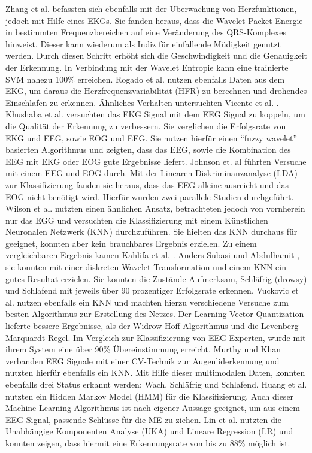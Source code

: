 {Zhang et al. \cite{zhang_6513058} befassten sich ebenfalls mit der Überwachung von Herzfunktionen, jedoch mit Hilfe eines EKGs. Sie fanden heraus, dass die Wavelet Packet Energie in bestimmten Frequenzbereichen auf eine Veränderung des QRS-Komplexes hinweist. Dieser kann wiederum als Indiz für einfallende Müdigkeit genutzt werden. Durch diesen Schritt erhöht sich  die Geschwindigkeit und die Genauigkeit der Erkennung. In Verbindung mit der Wavelet Entropie kann eine trainierte SVM nahezu 100\% erreichen. Rogado et al. \cite{Rogado_4913155} nutzen ebenfalls Daten aus dem EKG, um daraus die Herzfrequenzvariabilität (HFR) zu berechnen und drohendes Einschlafen zu erkennen. Ähnliches Verhalten untersuchten Vicente et al. \cite{Vicente_6164509}. \\

Khushaba et al. \cite{Khushaba_5580017} versuchten das EKG Signal mit dem EEG Signal zu koppeln, um die Qualität der Erkennung zu verbessern. Sie verglichen die Erfolgsrate von EKG und EEG, sowie EOG und EEG. Sie nutzen hierfür einen "`fuzzy wavelet"' basierten Algorithmus und zeigten, dass das EEG, sowie die Kombination des EEG mit EKG oder EOG gute Ergebnisse liefert. Johnson et. al \cite{Johnson11} führten Versuche mit einem EEG und EOG durch. Mit der Linearen Diskriminanzanalyse (LDA) zur Klassifizierung fanden sie heraus, dass das EEG alleine ausreicht und das EOG nicht benötigt wird. Hierfür wurden zwei parallele Studien durchgeführt. Wilson et al. \cite{wilson_890161} nutzten einen ähnlichen Ansatz, betrachteten jedoch von vornherein nur das EGG und versuchten die Klassifizierung mit einem Künstlichen Neuronalen Netzwerk (KNN) durchzuführen. Sie hielten das KNN durchaus für geeignet, konnten aber kein brauchbares Ergebnis erzielen. Zu einem vergleichbaren Ergebnis kamen Kahlifa et al. \cite{khalifa_893852}. Anders Subasi und Abdulhamit \cite{Subasi:2005:ARA:1707423.1707550}, sie konnten mit einer diskreten Wavelet-Transformation und einem KNN ein gutes Resultat erzielen. Sie konnten die Zustände Aufmerksam, Schläfrig (drowsy) und Schlafend mit jeweils über 90 prozentiger Erfolgsrate erkennen. Vuckovic et al. \cite{Vuckovic2002349} nutzen ebenfalls ein KNN und machten hierzu verschiedene Versuche zum besten Algorithmus zur Erstellung des Netzes. Der Learning Vector Quantization lieferte bessere Ergebnisse, als der Widrow-Hoff Algorithmus und die Levenberg–Marquardt Regel. Im Vergleich zur Klassifizierung von EEG Experten, wurde mit ihrem System  eine über 90\% Übereinstimmung erreicht. Murthy und Khan \cite{Murthy_1} verbanden EEG Signale mit einer CV-Technik zur Augenliderkennung und nutzten hierfür ebenfalls ein KNN. Mit Hilfe dieser multimodalen Daten, konnten ebenfalls drei Status erkannt werden: Wach, Schläfrig und Schlafend.
Huang et al. \cite{Huang_548971} nutzten ein Hidden Markov Model (HMM) für die Klassifizierung. Auch dieser Machine Learning Algorithmus ist nach eigener Aussage geeignet, um aus einem EEG-Signal, passende Schlüsse für die \acl{ME} zu ziehen. Lin et al. \cite{Lin05eeg-baseddrowsiness} nutzten die Unabhängige Komponenten Analyse (UKA) und Lineare Regression (LR) und konnten zeigen, dass hiermit eine Erkennungsrate von bis zu 88\% möglich ist.\\

}
